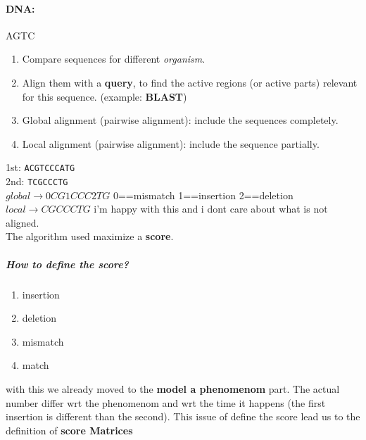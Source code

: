 \documentclass[11pt]{article}
\begin{document}
\paragraph{DNA:} %
\label{par:dna}
AGTC 
\begin{enumerate}
	\item Compare sequences for different \textit{organism}.
	\item Align them with a \textbf{query}, to find the active regions (or active parts) relevant for this sequence. (example: \textbf{BLAST})
	\item Global alignment (pairwise alignment): include the sequences completely.
	\item Local alignment (pairwise alignment): include the sequence partially.
\end{enumerate}
1st: \texttt{ACGTCCCATG}\\
2nd: \texttt{TCGCCCTG}\\
$global \rightarrow 0CG1CCC2TG$ 0==mismatch 1==insertion 2==deletion\\
$local \rightarrow CGCCCTG$ i'm happy with this and i dont care about what is not aligned.\\
The algorithm used maximize a \textbf{score}.
\subparagraph{How to define the score?} %
\label{subp:how_to_define_the_score_}
\begin{enumerate}
	\item insertion
	\item deletion
	\item mismatch 
	\item match
\end{enumerate}
with this we already moved to the \textbf{model a phenomenom} part.
The actual number differ wrt the phenomenom and wrt the time it happens (the first insertion is different than the second).
This issue of define the score lead us to the definition of \textbf{score Matrices}

\end{document}
